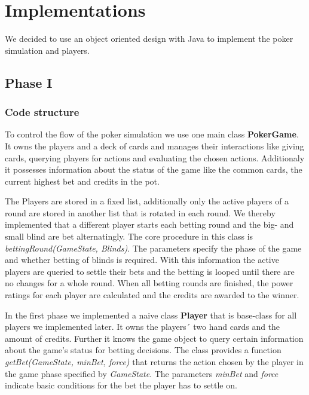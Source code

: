 

\section{Implementations}

We decided to use an object oriented design with Java to implement the poker simulation and players.

\subsection{Phase I}

\subsubsection{Code structure}

To control the flow of the poker simulation we use one main class \textbf{PokerGame}.
It owns the players and a deck of cards and manages their interactions like giving cards, querying players for actions
and evaluating the chosen actions. Additionaly it possesses information about the status of the game like the common
cards, the current highest bet and credits in the pot.

The Players are stored in a fixed list, additionally only the active players of a round are stored in another list that
is rotated in each round. We thereby implemented that a different player starts each betting round and the big- and
small blind are bet alternatingly. The core procedure in this class is \textit{bettingRound(GameState, Blinds)}. The
parameters specify the phase of the game and whether betting of blinds is required. With this information the active players are
queried to settle their bets and the betting is looped until there are no changes for a whole round. When all betting
rounds are finished, the power ratings for each player are calculated and the credits are awarded to the winner.

In the first phase we implemented a naive class \textbf{Player} that is base-class for all players we implemented later.
It owns the players´ two hand cards and the amount of credits. Further it knows the game object to query certain
information about the game's status for betting decisions. The class provides a function \textit{getBet(GameState, minBet,
force)} that returns the action chosen by the player in the game phase specified by \textit{GameState}. The parameters
\textit{minBet} and \textit{force} indicate basic conditions for the bet the player has to settle on.

